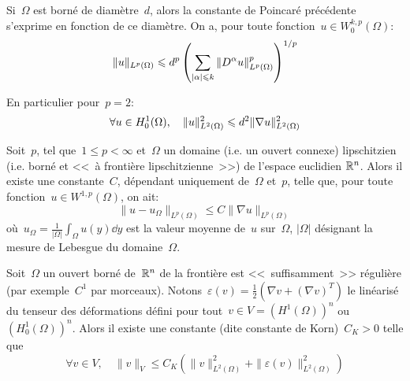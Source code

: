 \medskip

\begin{theoreme}
Si~$\Omega$ est borné de diamètre~$d$, alors la constante de Poincaré
précédente s'exprime en fonction de ce diamètre. On a,
pour toute fonction~$u\in W_0^{k,p}(\Omega)$:
\begin{equation}
\|u\|_{L^p(\Omega)} \leqslant d^p \left( \displaystyle\sum_{|\alpha|\leqslant k} \|D^\alpha u\|^p_{L^p(\Omega)}\right)^{1/p}
\end{equation}
\end{theoreme}

En particulier pour~$p=2$:
\begin{equation} \colorred\forall u\in H^1_0(\Omega),\quad \|u\|^2_{L^2(\Omega)} \le d^2
\|\nabla u\|^2_{L^2(\Omega)} \end{equation}


\medskip

\begin{theoreme}
Soit~$p$, tel que~$1 \le p <\infty$ et~$\Omega$ un domaine (i.e. un ouvert connexe) lipschitzien
(i.e. borné et <<~à frontière lipschitzienne~>>) de l'espace euclidien
$\mathbb R^n$.
Alors il existe une constante~$C$, dépendant uniquement de~$\Omega$ et~$p$, telle que,
pour toute fonction~$u\in W^{1,p}(\Omega)$, on ait:
\begin{equation}
\|u-u_\Omega\|_{L^p(\Omega)} \le C \|\nabla u\|_{L^p(\Omega)}
\end{equation}
où~$u_\Omega=\frac1{|\Omega|}\int_\Omega u(y)\dd y$ est la valeur
moyenne de~$u$ sur~$\Omega$, $|\Omega|$ désignant la mesure de Lebesgue
du domaine~$\Omega$.
\end{theoreme}


\bigskip
\begin{theoreme}
Soit~$\Omega$ un ouvert borné de~$\mathbb R^n$ de la frontière est <<~suffisamment~>> régulière
(par exemple~$C^1$ par morceaux).
Notons~$\varepsilon(v)=\frac{1}{2}\left(\nabla v + (\nabla v)^T \right)$ le linéarisé du
tenseur des déformations défini pour tout~$v\in V=\left(H^1(\Omega)\right)^n$ ou
$\left(H^1_0(\Omega)\right)^n$.
Alors il existe une constante (dite constante de Korn)~$C_K>0$ telle que
\begin{equation}
\forall v\in V, \quad
 \|v\|_{V} \le C_K \left( \|v\|^2_{L^2(\Omega)}+ \|\varepsilon(v)\|^2_{L^2(\Omega)}
\right)
\end{equation}
\end{theoreme}

